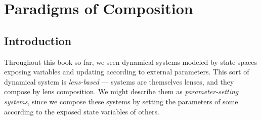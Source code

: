 \documentclass[DynamicalBook]{subfiles}
\begin{document}
%


\setcounter{chapter}{6}%

\chapter{Paradigms of Composition}\label{chapter.6} 

\section{Introduction}


Throughout this book so far, we seen dynamical systems modeled by state spaces exposing
variables and updating according to external parameters. This sort of dynamical
system is \emph{lens-based} --- systems are themselves lenses, and they compose by
lens composition. We might describe them as \emph{parameter-setting systems},
since we compose these systems by setting the parameters of some according to
the exposed state variables of others.
\end{document}
